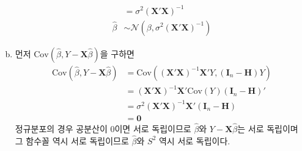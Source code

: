 \documentclass[answers]{exam}
\begin{document}
\begin{questions}
\begin{solution}
\begin{enumerate}[(a)]
\begin{align}
          &=\sigma^{2}\left(\mathbf{X}'\mathbf{X}\right)^{-1}\\
          \widehat{\beta} &\sim \mathcal{N}\left(\beta,\sigma^{2}\left(\mathbf{X}'\mathbf{X}\right)^{-1}\right)
        \end{align}
        \item 먼저 $\mathrm{Cov}\left(\widehat{\beta},Y-\mathbf{X}\widehat{\beta}\right)$을 구하면
        \begin{align}
          \mathrm{Cov}\left(\widehat{\beta},Y-\mathbf{X}\widehat{\beta}\right) &= \mathrm{Cov}\left(\left(\mathbf{X}'\mathbf{X}\right)^{-1}\mathbf{X}'Y,\left(\mathbf{I}_{n}-\mathbf{H}\right)Y\right)\\
          &=\left(\mathbf{X}'\mathbf{X}\right)^{-1}\mathbf{X}'\mathrm{Cov}\left(Y\right)\left(\mathbf{I}_{n}-\mathbf{H}\right)'\\
          &=\sigma^{2}\left(\mathbf{X}'\mathbf{X}\right)^{-1}\mathbf{X}'\left(\mathbf{I}_{n}-\mathbf{H}\right)\\
          &= \mathbf{0}
        \end{align}
        정규분포의 경우 공분산이 0이면 서로 독립이므로 $\widehat{\beta}$와 $Y-\mathbf{X}\widehat{\beta}$는 서로 독립이며 그 함수꼴 역시 서로 독립이므로 $\widehat{\beta}$와 $S^{2}$ 역시 서로 독립이다.
      \end{enumerate}
    \end{solution}
\end{questions}
\end{document}
